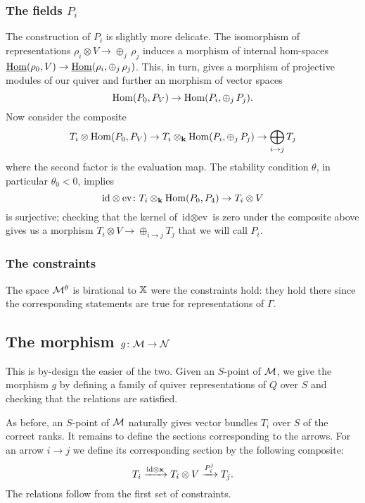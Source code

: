 \documentclass{amsart}
\theoremstyle{definition}
\begin{document}
\subsubsection{The fields $P_i$}

The construction of $P_i$ is slightly more delicate.
The isomorphism of representations $\rho_i \otimes V \rightarrow \oplus_j\, \rho_j$ induces a morphism of internal hom-spaces $\underline{\operatorname{Hom}}(\rho_0, V) \rightarrow \underline{\operatorname{Hom}}(\rho_i, \oplus_j \, \rho_j)$.
This, in turn, gives a morphism of projective modules of our quiver and further an morphism of vector spaces $$\operatorname{Hom}(P_0, P_V) \rightarrow \operatorname{Hom}(P_i, \oplus_j \, P_j).$$
Now consider the composite $$T_i \otimes \operatorname{Hom}(P_0, P_V) \rightarrow T_i \otimes_{\mathbf{k}} \operatorname{Hom}(P_i, \oplus_j \, P_j) \rightarrow \bigoplus_{i \rightarrow j} T_j$$ where the second factor is the evaluation map.
The stability condition $\theta$, in particular $\theta_0<0$, implies $$\text{id} \otimes \text{ev} \colon T_i \otimes_{\mathbf{k}} \operatorname{Hom}(P_0, P_4) \rightarrow T_i \otimes V$$ is surjective; checking that the kernel of $\text{id} \otimes \text{ev}$ is zero under the composite above gives us a morphism $T_i \otimes V \rightarrow \oplus_{i \rightarrow j} T_j$ that we will call $P_i$.

\subsubsection{The constraints}

The space $\mathcal{M}^\theta$ is birational to $\mathbb{X}$ were the constraints hold: they hold there since the corresponding statements are true for representations of $\Gamma$.

\subsection{The morphism $g \colon \mathcal{M} \rightarrow \mathcal{N}$}

This is by-design the easier of the two.
Given an $S$-point of $\mathcal{M}$, we give the morphism $g$ by defining a family of quiver representations of $Q$ over $S$ and checking that the relations are satisfied.

As before, an $S$-point of $\mathcal{M}$ naturally gives vector bundles $T_i$ over $S$ of the correct ranks.
It remains to define the sections corresponding to the arrows.
For an arrow $i \rightarrow j$ we define its corresponding section by the following composite:
$$T_i \xrightarrow{\text{id} \otimes \mathbf{x}} T_i \otimes V \xrightarrow{P_i^j} T_j.$$
The relations follow from the first set of constraints.
\end{document}
